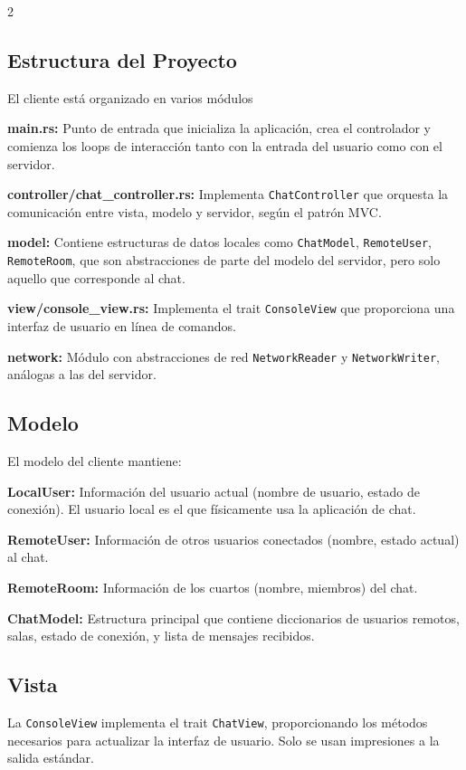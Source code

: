 \documentclass[letter,11pt]{article}
\begin{document}
\begin{multicols}{2}
\subsection{Estructura del Proyecto}

El cliente está organizado en varios módulos

\textbf{main.rs:} Punto de entrada que inicializa la aplicación, crea el controlador y comienza los loops de interacción tanto con la entrada del usuario como con el servidor.

\textbf{controller/chat\_controller.rs:} Implementa \texttt{ChatController} que orquesta la comunicación entre vista, modelo y servidor, según el patrón MVC.

\textbf{model:} Contiene estructuras de datos locales como \texttt{ChatModel}, \texttt{RemoteUser}, \texttt{RemoteRoom}, que son abstracciones de parte del modelo del servidor, pero solo aquello que corresponde al chat.

\textbf{view/console\_view.rs:} Implementa el trait \texttt{ConsoleView} que proporciona una interfaz de usuario en línea de comandos.

\textbf{network:} Módulo con abstracciones de red \texttt{NetworkReader} y \texttt{NetworkWriter}, análogas a las del servidor.

\subsection{Modelo}

El modelo del cliente mantiene:

\textbf{LocalUser:} Información del usuario actual (nombre de usuario, estado de conexión). El usuario local es el que físicamente usa la aplicación de chat.

\textbf{RemoteUser:} Información de otros usuarios conectados (nombre, estado actual) al chat.

\textbf{RemoteRoom:} Información de los cuartos (nombre, miembros) del chat.

\textbf{ChatModel:} Estructura principal que contiene diccionarios de usuarios remotos, salas, estado de conexión, y lista de mensajes recibidos.

\subsection{Vista}

La \texttt{ConsoleView} implementa el trait \texttt{ChatView}, proporcionando los métodos necesarios para actualizar la interfaz de usuario. Solo se usan impresiones a la salida estándar.



\end{multicols}
\end{document}
